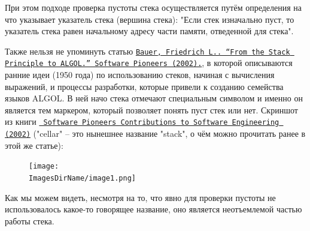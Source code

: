 При этом подходе проверка пустоты стека осуществляется путём определения на что указывает указатель стека (вершина стека): "Если стек изначально пуст, то указатель стека равен начальному адресу части памяти, отведенной для стека"{}. 

Также нельзя не упоминуть статью \href{https://www.semanticscholar.org/paper/From-the-Stack-Principle-to-ALGOL-Bauer/16e1cb82b8afd61e4209ea773a8c8976db9cdf4e}{\textcolor{UrlColorText}{\texttt{Bauer, Friedrich L.. “From the Stack Principle to ALGOL.” Software Pioneers (2002).}}}, в которой описываются ранние идеи (1950 года) по использованию стеков, начиная с вычисления выражений, и процессы разработки, которые привели к созданию семейства языков ALGOL. В ней начо стека отмечают специальным символом и именно он является тем маркером, который позволяет понять пуст стек или нет. Скриншот из книги  \href{https://link.springer.com/book/10.1007/978-3-642-59412-0}{\textcolor{UrlColorText}{\texttt{ Software Pioneers Contributions to Software Engineering (2002)}}} ("cellar"{} -- это нынешнее название "stack"{}, о чём можно прочитать ранее в этой же статье):
\begin{figure}[H]
  \centering
  \texttt{[image: \\ImagesDirName/image1.png]}
  \caption{}
\end{figure}

Как мы можем видеть, несмотря на то, что явно для проверки пустоты не использовалось какое-то говорящее название, оно является неотъемлемой частью работы стека.

